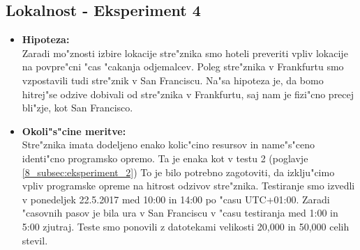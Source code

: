 \subsection{Lokalnost - Eksperiment 4}
\label{8_subsec:eksperiment_4}
\begin{itemize}
	\item \textbf{Hipoteza: }  \\
		Zaradi mo"znosti izbire lokacije stre"znika smo hoteli preveriti vpliv lokacije na povpre"cni "cas "cakanja odjemalcev. Poleg stre"znika v Frankfurtu smo vzpostavili tudi stre"znik v San Franciscu. Na"sa hipoteza je, da bomo hitrej"se odzive dobivali od stre"znika v Frankfurtu, saj nam je fizi"cno precej bli"zje, kot San Francisco.
			
	\item \textbf{Okoli"s"cine meritve: } \\
		Stre"znika imata dodeljeno enako kolic"cino resursov in name"s"ceno identi"cno programsko opremo. Ta je enaka kot v testu 2 (poglavje \ref{8_subsec:eksperiment_2}) To je bilo potrebno zagotoviti, da izklju"cimo vpliv programske opreme na hitrost odzivov stre"znika. Testiranje smo izvedli v ponedeljek 22.5.2017 med 10:00 in 14:00 po "casu UTC+01:00. Zaradi "casovnih pasov je bila ura v San Franciscu v "casu testiranja med 1:00 in 5:00 zjutraj. Teste smo ponovili z datotekami velikosti 20,000 in 50,000 celih stevil. 


\end{itemize}
